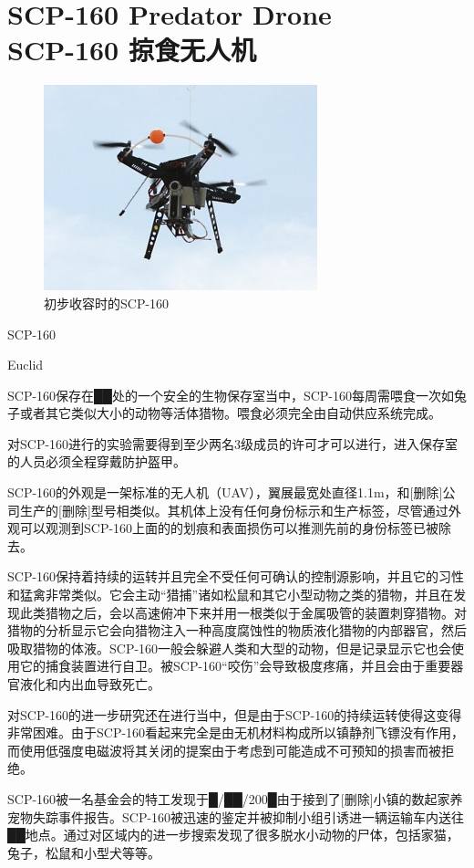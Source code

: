 \chapter[SCP-160 掠食无人机]{
    SCP-160 Predator Drone\\
    SCP-160 掠食无人机
}

\label{chap:SCP-160}

\begin{figure}[H]
    \centering
    \includegraphics[width=0.5\linewidth]{images/SCP-160.jpg}
    \caption*{初步收容时的SCP-160}
\end{figure}

SCP-160

Euclid

SCP-160保存在██处的一个安全的生物保存室当中，SCP-160每周需喂食一次如兔子或者其它类似大小的动物等活体猎物。喂食必须完全由自动供应系统完成。

对SCP-160进行的实验需要得到至少两名3级成员的许可才可以进行，进入保存室的人员必须全程穿戴防护盔甲。

SCP-160的外观是一架标准的无人机（UAV），翼展最宽处直径1.1m，和{[}删除]公司生产的{[}删除]型号相类似。其机体上没有任何身份标示和生产标签，尽管通过外观可以观测到SCP-160上面的的划痕和表面损伤可以推测先前的身份标签已被除去。

SCP-160保持着持续的运转并且完全不受任何可确认的控制源影响，并且它的习性和猛禽非常类似。它会主动“猎捕”诸如松鼠和其它小型动物之类的猎物，并且在发现此类猎物之后，会以高速俯冲下来并用一根类似于金属吸管的装置刺穿猎物。对猎物的分析显示它会向猎物注入一种高度腐蚀性的物质液化猎物的内部器官，然后吸取猎物的体液。SCP-160一般会躲避人类和大型的动物，但是记录显示它也会使用它的捕食装置进行自卫。被SCP-160“咬伤”会导致极度疼痛，并且会由于重要器官液化和内出血导致死亡。

对SCP-160的进一步研究还在进行当中，但是由于SCP-160的持续运转使得这变得非常困难。由于SCP-160看起来完全是由无机材料构成所以镇静剂飞镖没有作用，而使用低强度电磁波将其关闭的提案由于考虑到可能造成不可预知的损害而被拒绝。

SCP-160被一名基金会的特工发现于█\slash ██\slash 200█由于接到了{[}删除]小镇的数起家养宠物失踪事件报告。SCP-160被迅速的鉴定并被抑制小组引诱进一辆运输车内送往██地点。通过对区域内的进一步搜索发现了很多脱水小动物的尸体，包括家猫，兔子，松鼠和小型犬等等。
